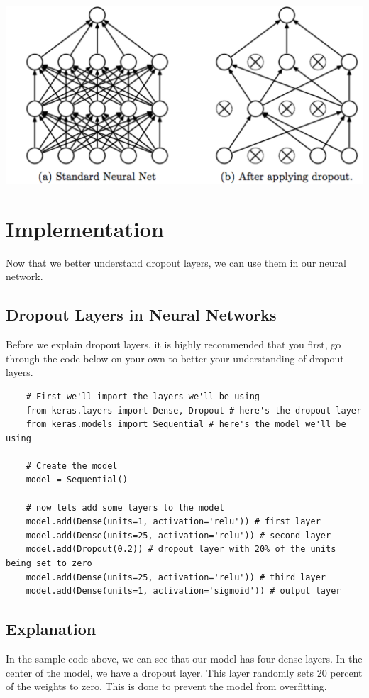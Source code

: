 \documentclass[11pt]{report}
\begin{document}
\begin{center}
    \includegraphics[scale=0.2]{./images/dropoutexample.png}
\end{center}



\chapter{Implementation}
Now that we better understand dropout layers, we can use them in our neural network.

\section{Dropout Layers in Neural Networks}
Before we explain dropout layers, it is highly recommended that you first, go through the code below on your own to better your understanding of dropout layers.

\begin{verbatim}
    # First we'll import the layers we'll be using
    from keras.layers import Dense, Dropout # here's the dropout layer
    from keras.models import Sequential # here's the model we'll be using

    # Create the model
    model = Sequential()

    # now lets add some layers to the model
    model.add(Dense(units=1, activation='relu')) # first layer
    model.add(Dense(units=25, activation='relu')) # second layer
    model.add(Dropout(0.2)) # dropout layer with 20% of the units being set to zero
    model.add(Dense(units=25, activation='relu')) # third layer
    model.add(Dense(units=1, activation='sigmoid')) # output layer
\end{verbatim}

\section{Explanation}
In the sample code above, we can see that our model has four dense layers. In the center of the model, we have a dropout layer. This layer randomly sets 20 percent of the weights to zero. This is done to prevent the model from overfitting. 
\end{document}
